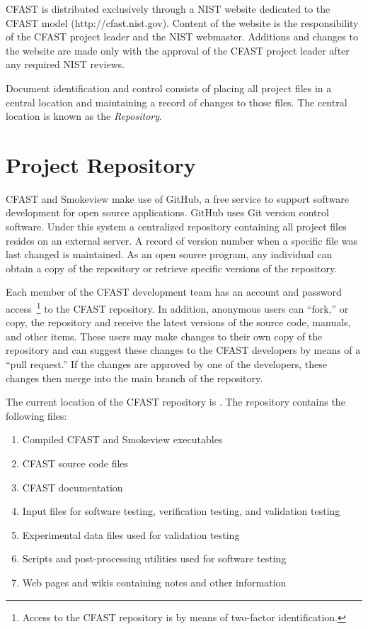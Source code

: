 \documentclass[12pt]{book}
\begin{document}
CFAST is distributed exclusively through a NIST website dedicated to the CFAST model (http://cfast.nist.gov).  Content of the website is the responsibility of the CFAST project leader and the NIST webmaster. Additions and changes to the website are made only with the approval of the CFAST project leader after any required NIST reviews.

Document identification and control consists of placing all project files in a central location and maintaining a record of changes to those files. The central location is known as the {\em Repository}.

\section{Project Repository}

CFAST and Smokeview make use of GitHub, a free service to support software development for open source applications. GitHub uses Git version control software. Under this system a centralized repository containing all project files resides on an external server.   A record of version number when a specific file was last changed is maintained. As an open source program, any individual can obtain a copy of the repository or retrieve specific versions of the repository.

Each member of the CFAST development team has an account and password access~\footnote{Access to the CFAST repository is by means of two-factor identification.} to the CFAST repository. In addition, anonymous users can ``fork,'' or copy, the repository and receive the latest versions of the source code, manuals, and other items. These users may make changes to their own copy of the repository and can suggest these changes to the CFAST developers by means of a ``pull request.'' If the changes are approved by one of the developers, these changes then merge into the main branch of the repository.

The current location of the CFAST repository is \href{https://github.com/firemodels/fds-smv}{}. The repository contains the following files:
\begin{enumerate}
\item Compiled CFAST and Smokeview executables
\item CFAST source code files
\item CFAST documentation
\item Input files for software testing, verification testing, and validation testing
\item Experimental data files used for validation testing
\item Scripts and post-processing utilities used for software testing
\item Web pages and wikis containing notes and other information
\end{enumerate}
\end{document}

